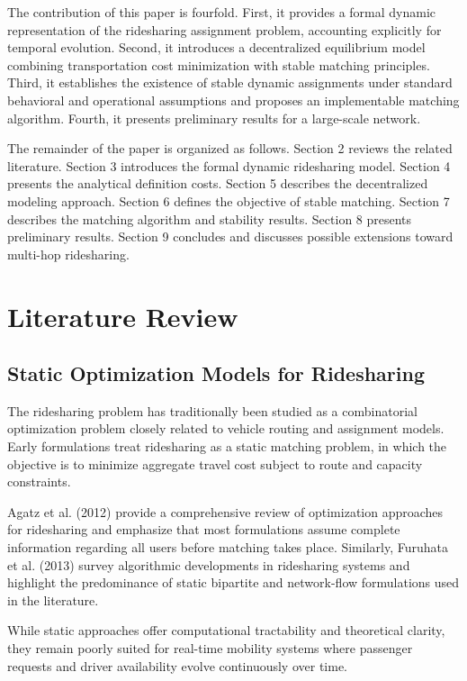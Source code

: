 \documentclass[11pt,a4paper]{article}
\begin{document}
The contribution of this paper is fourfold. First, it provides a formal dynamic representation of the ridesharing assignment problem, accounting explicitly for temporal evolution. Second, it introduces a decentralized equilibrium model combining transportation cost minimization with stable matching principles. Third, it establishes the existence of stable dynamic assignments under standard behavioral and operational assumptions and proposes an implementable matching algorithm. Fourth, it presents preliminary results for a large-scale network.

The remainder of the paper is organized as follows. Section 2 reviews the related literature. Section 3 introduces the formal dynamic ridesharing model. Section 4 presents the analytical definition costs. Section 5 describes the decentralized modeling approach. Section 6 defines the objective of stable matching. Section 7 describes the matching algorithm and stability results. Section 8 presents preliminary results. Section 9 concludes and discusses possible extensions toward multi-hop ridesharing.

\section{Literature Review}

\subsection{Static Optimization Models for Ridesharing}
The ridesharing problem has traditionally been studied as a combinatorial optimization problem closely related to vehicle routing and assignment models. Early formulations treat ridesharing as a static matching problem, in which the objective is to minimize aggregate travel cost subject to route and capacity constraints.

Agatz et al. (2012) provide a comprehensive review of optimization approaches for ridesharing and emphasize that most formulations assume complete information regarding all users before matching takes place. Similarly, Furuhata et al. (2013) survey algorithmic developments in ridesharing systems and highlight the predominance of static bipartite and network-flow formulations used in the literature.

While static approaches offer computational tractability and theoretical clarity, they remain poorly suited for real-time mobility systems where passenger requests and driver availability evolve continuously over time.
\end{document}
